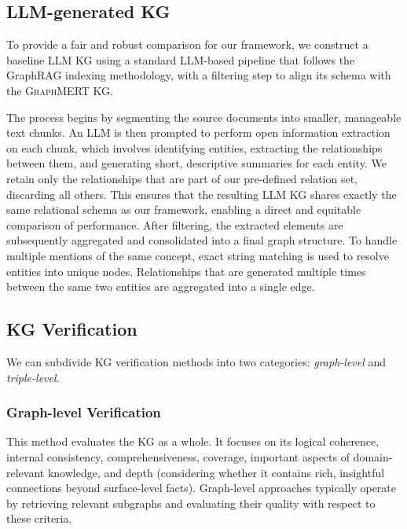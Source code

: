 \documentclass[10pt]{article}
\newcommand{\ours}{\textsc{GraphMERT}\xspace}
\begin{document}
\subsection{LLM-generated KG}
\label{subsec:create_llm_extracted_kg}
To provide a fair and robust comparison for our framework, we construct a baseline LLM KG using a standard LLM-based pipeline that follows the GraphRAG indexing methodology, with a filtering step to align its schema with the \ours KG. 

The process begins by segmenting the source documents into smaller, manageable text chunks. An LLM is then prompted to perform open information extraction on each chunk, which involves identifying entities, extracting the relationships between them, and generating short, descriptive summaries for each entity. We retain only the relationships that are part of our pre-defined relation set, discarding all others. This ensures that the resulting LLM KG shares exactly the same relational schema as our framework, enabling a direct and equitable comparison of performance. After filtering, the extracted elements are subsequently aggregated and consolidated into a final graph structure. To handle multiple mentions of the same concept, exact string matching is used to resolve entities into unique nodes. Relationships that are generated multiple times between the same two entities are aggregated into a single edge. 

\subsection{KG Verification}
\label{subsec:verification}
We can subdivide KG verification methods into two categories: \textit{graph-level} and \textit{triple-level}. 

\subsubsection{Graph-level Verification}

This method evaluates the KG as a whole. It focuses on its logical coherence, internal consistency, comprehensiveness, coverage, important aspects of domain-relevant knowledge, and depth (considering whether it contains rich, insightful connections beyond surface-level facts). Graph-level approaches typically operate by retrieving relevant subgraphs and evaluating their quality with respect to these criteria.
\end{document}

